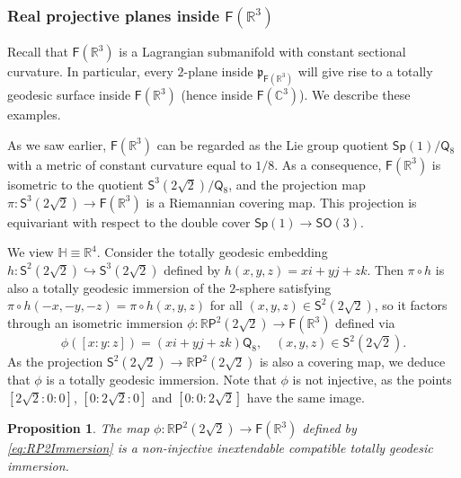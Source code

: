 \documentclass[11pt,a4paper,final]{amsart}
\newcommand{\s}{\mathsf}
\newcommand{\g}{\mathfrak}
\newcommand{\R}{\mathbb{R}}
\newcommand{\C}{\mathbb{C}}
\renewcommand{\H}{\mathbb{H}}
\newtheorem{proposition}[theorem]{Proposition}
\theoremstyle{definition}
\begin{document}
\subsubsection{Real projective planes inside $\mathsf{F}(\R^{3})$}
\label{subsec:projplanerealflag}
Recall that $\mathsf{F}(\R^{3})$ is a Lagrangian submanifold with constant sectional curvature.
In particular, every $2$-plane inside $\g{p}_{\mathsf{F}(\R^{3})}$ will give rise to a totally geodesic surface inside $\mathsf{F}(\R^{3})$ (hence inside $\mathsf{F}(\C^{3})$).	
We describe these examples.
	
As we saw earlier, $\s{F}(\R^{3})$ can be regarded as the Lie group quotient $\s{Sp}(1)/\s{Q}_{8}$ with a metric of constant curvature equal to $1/8$.
As a consequence, $\s{F}(\R^{3})$ is isometric to the quotient $\s{S}^{3}(2\sqrt{2})/\s{Q}_{8}$, and the projection map $\pi\colon \s{S}^{3}(2\sqrt{2})\to\s{F}(\R^{3})$ is a Riemannian covering map.
This projection is equivariant with respect to the double cover $\s{Sp}(1)\to\s{SO}(3)$.
	
We view $\H\equiv\R^{4}$.
Consider the totally geodesic embedding $h\colon\s{S}^{2}(2\sqrt{2})\hookrightarrow \s{S}^{3}(2\sqrt{2})$ defined by $h(x,y,z)=xi+yj+zk$.
Then $\pi\circ h$ is also a totally geodesic immersion of the $2$-sphere satisfying $\pi\circ h(-x,-y,-z)=\pi\circ h(x,y,z)$ for all $(x,y,z)\in\s{S}^{2}(2\sqrt{2})$, so it factors through an isometric immersion $\phi\colon \R\s{P}^{2}(2\sqrt{2})\to\s{F}(\R^{3})$ defined via
\begin{equation}\label{eq:RP2Immersion}
	\phi([x:y:z])=(xi+yj+zk)\s{Q}_{8}, \quad (x,y,z)\in\s{S}^{2}(2\sqrt{2}).
	\end{equation}
As the projection $\s{S}^{2}(2\sqrt{2})\to\R\s{P}^{2}(2\sqrt{2})$ is also a covering map, we deduce that $\phi$ is a totally geodesic immersion.
Note that $\phi$ is not injective, as the points $[2\sqrt{2}:0:0]$, $[0:2\sqrt{2}:0]$ and $[0:0:2\sqrt{2}]$ have the same image.
	
\begin{proposition}
	The map $\phi\colon \R\s{P}^{2}(2\sqrt{2})\to\s{F}(\R^{3})$ defined by \eqref{eq:RP2Immersion} is a non-injective inextendable compatible totally geodesic immersion.
\end{proposition}
	
\end{document}
